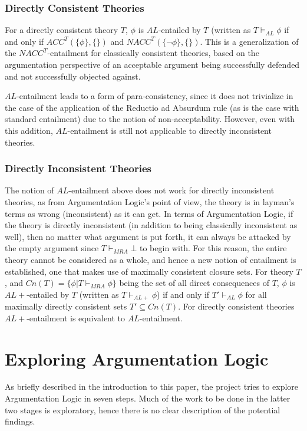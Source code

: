 \documentclass[11pt,twoside,a4paper]{report}
\begin{document}
\subsubsection{Directly Consistent Theories}
For a directly consistent theory $T$, $\phi$ is $AL$-entailed by $T$ (written as $T\models_{AL}\phi$ if and only if $ACC^T(\{\phi\},\{\})$ and $NACC^T(\{\neg\phi\},\{\})$. This is a generalization of the $NACC^T$-entailment for classically consistent theories, based on the argumentation perspective of an acceptable argument being successfully defended and not successfully objected against.

$AL$-entailment leads to a form of para-consistency, since it does not trivialize in the case of the application of the Reductio ad Absurdum rule (as is the case with standard entailment) due to the notion of non-acceptability. However, even with this addition, $AL$-entailment is still not applicable to directly inconsistent theories.

\subsubsection{Directly Inconsistent Theories}
The notion of $AL$-entailment above does not work for directly inconsistent theories, as from Argumentation Logic's point of view, the theory is in layman's terms as wrong (inconsistent) as it can get. In terms of Argumentation Logic, if the theory is directly inconsistent (in addition to being classically inconsistent as well), then no matter what argument is put forth, it can always be attacked by the empty argument since $T\vdash_{MRA}\bot$ to begin with. 
For this reason, the entire theory cannot be considered as a whole, and hence a new notion of entailment is established, one that makes use of maximally consistent closure sets. For theory $T$, and $Cn(T) = \{\phi| T\vdash_{MRA}\phi\}$ being the set of all direct consequences of $T$, $\phi$ is $AL+$-entailed by $T$ (written as $T\vdash_{AL+}\phi$) if and only if $T'\vdash_{AL}\phi$ for all maximally directly consistent sets $T'\subseteq Cn(T)$. For directly consistent theories $AL+$-entailment is equivalent to $AL$-entailment. 

\section{Exploring Argumentation Logic}
As briefly described in the introduction to this paper, the project tries to explore Argumentation Logic in seven steps. Much of the work to be done in the latter two stages is exploratory, hence there is no clear description of the potential findings.
\end{document}
